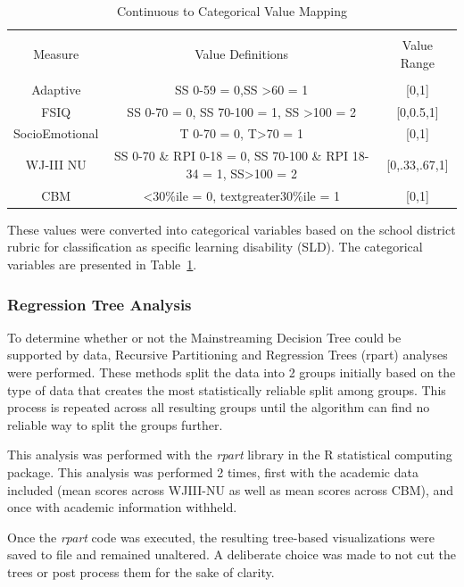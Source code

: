 \documentclass[twoside]{article}
\begin{document}
%
%
%
%
\begin{table}[htbp!]
	\centering
	\caption{Continuous to Categorical Value Mapping}
	\label{tab6}
	\begin{tabular}{ccc}
		\hline \\
		Measure & Value Definitions & Value Range\\
		\hline \\
		Adaptive & SS 0-59 = 0,SS \textgreater60 = 1 & [0,1]\\
		FSIQ & SS 0-70 = 0, SS 70-100 = 1, SS \textgreater100 = 2 & [0,0.5,1]\\
		SocioEmotional & T 0-70 = 0, T\textgreater70 = 1 & [0,1]\\
		WJ-III NU & SS 0-70 \& RPI 0-18 = 0, SS 70-100 \& RPI 18-34 = 1, SS\textgreater100 = 2 & [0,.33,.67,1]\\
		CBM & \textless30\%ile = 0, textgreater30\%ile = 1 &  [0,1]\\
		\hline
	\end{tabular}
\end{table}
%
%
%
%
These values were converted into categorical variables based on the school district rubric for classification as specific learning disability (SLD). The categorical variables are presented in Table~\ref{tab6}.

\subsubsection{Regression Tree Analysis}
To determine whether or not the Mainstreaming Decision Tree could be supported by data, Recursive Partitioning and Regression Trees (rpart) analyses were performed. These methods split the data into 2 groups initially based on the type of data that creates the most statistically reliable split among groups. This process is repeated across all resulting groups until the algorithm can find no reliable way to split the groups further.

This analysis was performed with the \textit{rpart} library in the R statistical computing package. This analysis was performed 2 times, first with the academic data included (mean scores across WJIII-NU as well as mean scores across CBM), and once with academic information withheld.

Once the \textit{rpart} code was executed, the resulting tree-based visualizations were saved to file and remained unaltered. A deliberate choice was made to not cut the trees or post process them for the sake of clarity. 
\end{document}
